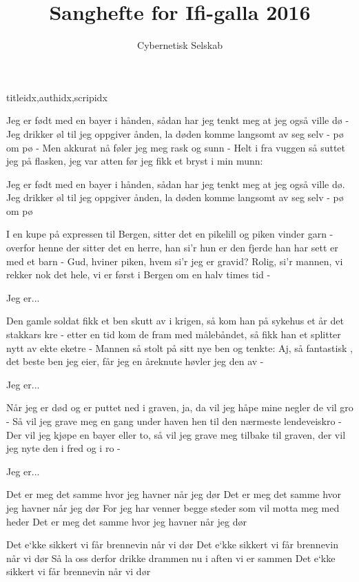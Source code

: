 \documentclass[14pt,letterpaper,norsk]{article}
\title{Sanghefte for Ifi-galla 2016}
\author{Cybernetisk Selskab}
\date{}
\begin{document}

\newpage

\begin{songs}{titleidx,authidx,scripidx}

\beginverse
Jeg er født med en bayer i hånden,
sådan har jeg tenkt meg at jeg også ville dø -
Jeg drikker øl til jeg oppgiver ånden,
la døden komme langsomt av seg selv - pø om pø -
Men akkurat nå føler jeg meg rask og sunn -
Helt i fra vuggen så suttet jeg på flasken,
jeg var atten før jeg fikk et bryst i min munn:
\endverse

\beginchorus
Jeg er født med en bayer i hånden,
sådan har jeg tenkt meg at jeg også ville dø.
Jeg drikker øl til jeg oppgiver ånden,
la døden komme langsomt av seg selv - pø om pø
\endchorus

\beginverse
I en kupe på expressen til Bergen,
sitter det en pikelill og piken vinder garn -
overfor henne der sitter det en herre,
han si'r hun er den fjerde han har sett er med et barn -
Gud, hviner piken, hvem si'r jeg er gravid?
Rolig, si'r mannen, vi rekker nok det hele,
vi er først i Bergen om en halv times tid -
\endverse

\beginchorus
Jeg er...
\endchorus

\beginverse
Den gamle soldat fikk et ben skutt av i krigen,
så kom han på sykehus et år det stakkars kre -
etter en tid kom de fram med målebåndet,
så fikk han et splitter nytt av ekte eketre -
Mannen så stolt på sitt nye ben og tenkte:
Aj, så fantastisk , det beste ben jeg eier,
får jeg en åreknute høvler jeg den av -
\endverse

\beginchorus
Jeg er...
\endchorus

\beginverse
Når jeg er død og er puttet ned i graven,
ja, da vil jeg håpe mine negler de vil gro -
Så vil jeg grave meg en gang under haven
hen til den nærmeste lendeveiskro -
Der vil jeg kjøpe en bayer eller to,
så vil jeg grave meg tilbake til graven,
der vil jeg nyte den i fred og i ro -
\endverse

\beginchorus
Jeg er...
\endchorus
\endsong

\beginverse
Det er meg det samme hvor jeg havner når jeg dør
Det er meg det samme hvor jeg havner når jeg dør
For jeg har venner begge steder som vil motta meg med heder
Det er meg det samme hvor jeg havner når jeg dør
\endverse

\beginverse
Det e`kke sikkert vi får brennevin når vi dør
Det e`kke sikkert vi får brennevin når vi dør
Så la oss derfor drikke drammen nu i aften vi er sammen
Det e`kke sikkert vi får brennevin når vi dør
\endverse


\end{songs}
\end{document}
